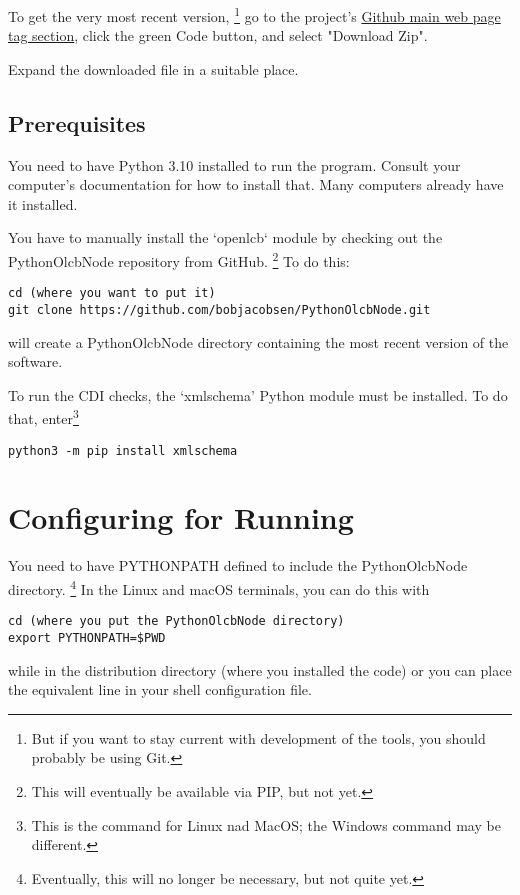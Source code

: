 \documentclass[11pt]{article}
\begin{document}
To get the very most recent version,
\footnote{But if you want to stay current with development of the tools, you should probably be using Git.}
go to the project's
\href{https://github.com/bobjacobsen/PythonOlcbNode}{Github main web page tag section},
click the green Code button, and select "Download Zip".

Expand the downloaded file in a suitable place.

\subsection{Prerequisites}

You need to have Python 3.10 installed to run the program. Consult your
computer's documentation for how to install that.  Many computers already
have it installed.

You have to manually install the `openlcb` module by checking out the 
PythonOlcbNode repository from GitHub.
\footnote{This will eventually be available via PIP, but not yet.}
To do this:
\begin{verbatim}
cd (where you want to put it)
git clone https://github.com/bobjacobsen/PythonOlcbNode.git
\end{verbatim}
will create a PythonOlcbNode directory containing the most recent version of the software.

To run the CDI checks, the `xmlschema' Python module must be installed. To do that, 
enter\footnote{This is the command for Linux nad MacOS; the Windows command may be different.}

\begin{verbatim}
python3 -m pip install xmlschema
\end{verbatim}

\section{Configuring for Running}

You need to have PYTHONPATH defined to include the PythonOlcbNode directory.
\footnote{Eventually, this will no longer be necessary, but not quite yet.}
In the Linux and macOS
terminals, you can do this with

\begin{verbatim}
cd (where you put the PythonOlcbNode directory)
export PYTHONPATH=$PWD
\end{verbatim}

while in the distribution directory (where you installed the code)
or you can place the equivalent line in your shell configuration file.
\end{document}
